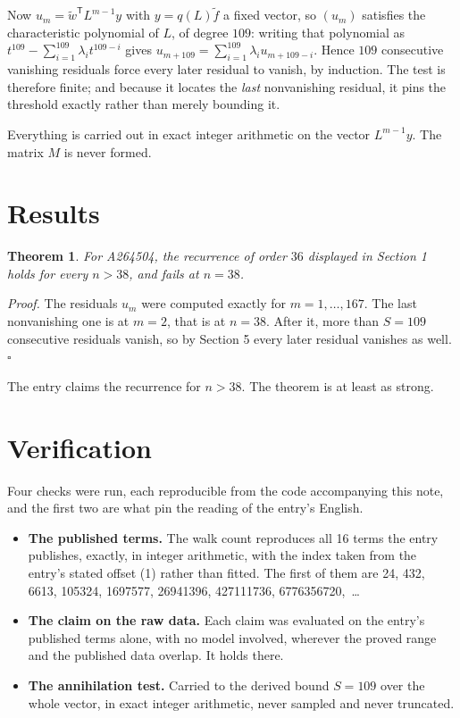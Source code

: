 \documentclass[11pt]{article}
\newtheorem{theorem}{Theorem}
\theoremstyle{definition}
\begin{document}
Now $u_m = \tilde w^{\mathsf T} L^{m-1} y$ with $y = q(L)\tilde f$ a fixed vector, so $(u_m)$ satisfies the characteristic polynomial of $L$, of degree $109$: writing that polynomial as $t^{109} - \sum_{i=1}^{109} \lambda_i t^{109-i}$ gives $u_{m+109} = \sum_{i=1}^{109} \lambda_i u_{m+109-i}$. Hence $109$ consecutive vanishing residuals force every later residual to vanish, by induction. The test is therefore finite; and because it locates the {\itshape last} nonvanishing residual, it pins the threshold exactly rather than merely bounding it.

Everything is carried out in exact integer arithmetic on the vector $L^{m-1}y$. The matrix $M$ is never formed.

\section{Results}

\begin{theorem} For A264504, the recurrence of order $36$ displayed in Section 1 holds for every $n > 38$, and fails at $n = 38$.\end{theorem}

{\itshape Proof.} The residuals $u_m$ were computed exactly for $m = 1,\dots,167$. The last nonvanishing one is at $m = 2$, that is at $n = 38$. After it, more than $S = 109$ consecutive residuals vanish, so by Section 5 every later residual vanishes as well. $\square$

The entry claims the recurrence for $n > 38$. The theorem is at least as strong.

\section{Verification}

Four checks were run, each reproducible from the code accompanying this note, and the first two are what pin the reading of the entry's English.

\begin{itemize}

\item {\bfseries The published terms.} The walk count reproduces all 16 terms the entry publishes, exactly, in integer arithmetic, with the index taken from the entry's stated offset (1) rather than fitted. The first of them are 24, 432, 6613, 105324, 1697577, 26941396, 427111736, 6776356720,~\dots

\item {\bfseries The claim on the raw data.} Each claim was evaluated on the entry's published terms alone, with no model involved, wherever the proved range and the published data overlap. It holds there.

\item {\bfseries The annihilation test.} Carried to the derived bound $S = 109$ over the whole vector, in exact integer arithmetic, never sampled and never truncated.

\end{itemize}
\end{document}
